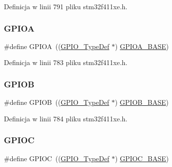 Definicja w linii 791 pliku stm32f411xe.\+h.

\mbox{\label{group___peripheral__declaration_gac485358099728ddae050db37924dd6b7}} 
\subsubsection{\texorpdfstring{G\+P\+I\+OA}{GPIOA}}
{\footnotesize\ttfamily \#define G\+P\+I\+OA~((\hyperlink{struct_g_p_i_o___type_def}{G\+P\+I\+O\+\_\+\+Type\+Def} $\ast$) \hyperlink{group___peripheral__memory__map_gad7723846cc5db8e43a44d78cf21f6efa}{G\+P\+I\+O\+A\+\_\+\+B\+A\+SE})}



Definicja w linii 783 pliku stm32f411xe.\+h.

\mbox{\label{group___peripheral__declaration_ga68b66ac73be4c836db878a42e1fea3cd}} 
\subsubsection{\texorpdfstring{G\+P\+I\+OB}{GPIOB}}
{\footnotesize\ttfamily \#define G\+P\+I\+OB~((\hyperlink{struct_g_p_i_o___type_def}{G\+P\+I\+O\+\_\+\+Type\+Def} $\ast$) \hyperlink{group___peripheral__memory__map_gac944a89eb789000ece920c0f89cb6a68}{G\+P\+I\+O\+B\+\_\+\+B\+A\+SE})}



Definicja w linii 784 pliku stm32f411xe.\+h.

\mbox{\label{group___peripheral__declaration_ga2dca03332d620196ba943bc2346eaa08}} 
\subsubsection{\texorpdfstring{G\+P\+I\+OC}{GPIOC}}
{\footnotesize\ttfamily \#define G\+P\+I\+OC~((\hyperlink{struct_g_p_i_o___type_def}{G\+P\+I\+O\+\_\+\+Type\+Def} $\ast$) \hyperlink{group___peripheral__memory__map_ga26f267dc35338eef219544c51f1e6b3f}{G\+P\+I\+O\+C\+\_\+\+B\+A\+SE})}



